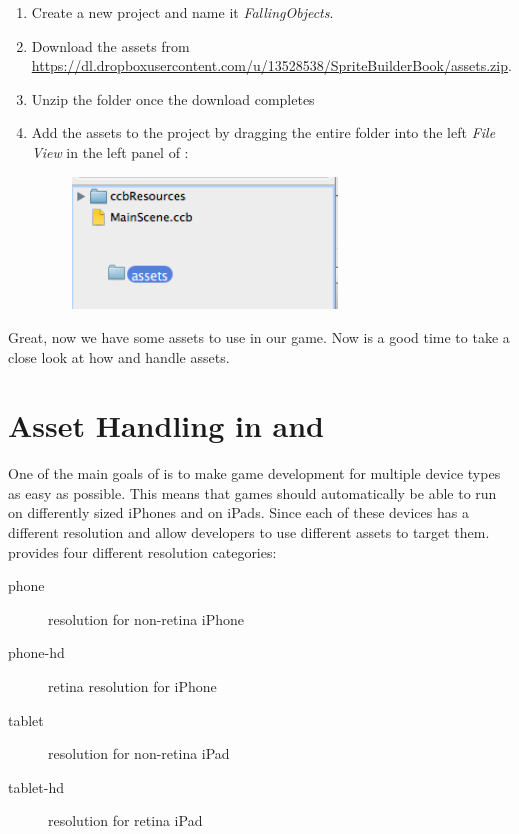 \begin{leftbar}
\begin{enumerate}
  \item Create a new \SB{} project and name it \textit{FallingObjects}.
  \item Download the assets from
  \url{https://dl.dropboxusercontent.com/u/13528538/SpriteBuilderBook/assets.zip}.
  \item Unzip the folder once the download completes
  \item Add the assets to the project by dragging the
entire folder into the left \textit{File View} in the left panel of
\SB{}:
\begin{figure}[H]
    \centering
    \includegraphics[width=200pt]{images/Chapter2/DragAssets.png}
\end{figure}
\end{enumerate}
\end{leftbar}

Great, now we have some assets to use in our game. Now is a good time to take a
close look at how \SB{} and \cocos{} handle assets.

\section{Asset Handling in \SB{} and \cocos{}}
One of the main goals of \SB{} is to make game development for multiple device
types as easy as possible. This means that games should automatically be able to
run on differently sized iPhones and on iPads. Since each of these
devices has a different resolution \cocos{} and \SB{} allow developers to use different assets to target them. \SB{}
provides four different resolution categories:
\begin{description}
\item[phone] resolution for non-retina iPhone
\item[phone-hd] retina resolution for iPhone
\item[tablet] resolution for non-retina iPad
\item[tablet-hd] resolution for retina iPad
\end{description}

